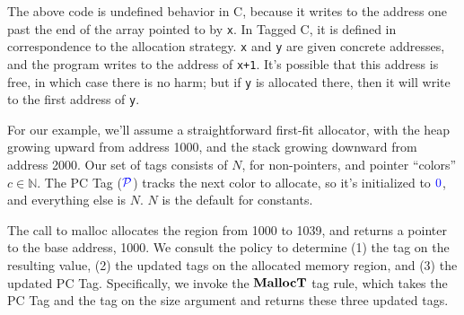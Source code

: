 \documentclass[acmsmall,review,anonymous]{acmart}\settopmatter{printfolios=true,printccs=false,printacmref=false}
\begin{document}
The above code is undefined behavior in C, because it writes to the address one past the end
of the array pointed to by {\tt x}. In Tagged C, it is defined in correspondence to
the allocation strategy. {\tt x} and {\tt y} are given concrete addresses, and the program
writes to the address of {\tt x+1}. It's possible that this address is free, in which case
there is no harm; but if {\tt y} is allocated there, then it will write to the first address
of {\tt y}.

For our example, we'll assume a straightforward first-fit allocator, with the heap growing upward
from address 1000, and the stack growing downward from address 2000. Our set of tags consists of
\(N\), for non-pointers, and pointer ``colors'' \(c \in \mathbb{N}\). The PC Tag
(\(\mathcal{\color{blue} P}\)) tracks the next color to allocate, so it's initialized to \({\color{blue} 0}\), and everything else is \(N\).
\(N\) is the default for constants.


The call to malloc allocates the region from 1000 to 1039, and returns a pointer to the base
address, 1000. We consult the policy to determine (1) the tag on the resulting value,
(2) the updated tags on the allocated memory region, and (3) the updated PC Tag.
Specifically, we invoke the \(\mathbf{MallocT}\) tag rule, which takes the PC Tag and the tag on
the size argument and returns these three updated tags.
\end{document}

